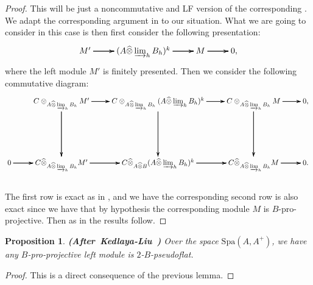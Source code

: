 \documentclass[12pt]{amsart}
\newtheorem{proposition}[theorem]{Proposition}
\theoremstyle{definition}
\numberwithin{equation}{section}
\begin{document}
\begin{proof}
This will be just a noncommutative and LF version of the corresponding  \cite[Lemma 2.4.7]{KL2}. We adapt the corresponding argument in \cite[Lemma 2.4.7]{KL2} to our situation. What we are going to consider in this case is then first consider the following presentation:
\[
\xymatrix@C+0pc@R+0pc{
M'  \ar[r]\ar[r]\ar[r] &(A\widehat{\otimes}\varinjlim_h B_h)^k \ar[r]\ar[r]\ar[r] & M\ar[r]\ar[r]\ar[r] &0,
}
\]
where the left module $M'$ is finitely presented. Then we consider the following commutative diagram:
\[
\xymatrix@C+0pc@R+3pc{
&C\otimes_{A\widehat{\otimes}\varinjlim_h B_h}M'  \ar[r]\ar[r]\ar[r]  \ar[d]\ar[d]\ar[d] &C\otimes_{A\widehat{\otimes}\varinjlim_h B_h}(A\widehat{\otimes}\varinjlim_h B_h)^k \ar[r]\ar[r]\ar[r] \ar[d]\ar[d]\ar[d] & C\otimes_{A\widehat{\otimes}\varinjlim_h B_h}M\ar[r]\ar[r]\ar[r] \ar[d]\ar[d]\ar[d] &0,\\
0 \ar[r]\ar[r]\ar[r] &C\widehat{\otimes}_{A\widehat{\otimes}\varinjlim_h B_h}M'  \ar[r]\ar[r]\ar[r] &C\widehat{\otimes}_{A\widehat{\otimes}B}(A\widehat{\otimes}\varinjlim_h B_h)^k \ar[r]\ar[r]\ar[r] & C\widehat{\otimes}_{A\widehat{\otimes}\varinjlim_h B_h}M\ar[r]\ar[r]\ar[r] &0.
}
\]\\
The first row is exact as in \cite[Lemma 2.4.7]{KL2}, and we have the corresponding second row is also exact since we have that by hypothesis the corresponding module $M$ is $B$-pro-projective.  
Then as in \cite[Lemma 2.4.7]{KL2} the results follow.	
\end{proof}


\begin{proposition} \mbox{\bf{(After Kedlaya-Liu \cite[Corollary 2.4.8]{KL2})}}
Over the space $\mathrm{Spa}(A,A^+)$, we have any $B$-pro-projective left module is $2$-$B$-pseudoflat.
\end{proposition}

\begin{proof}
This is a direct consequence of the previous lemma.	
\end{proof}
\end{document}
